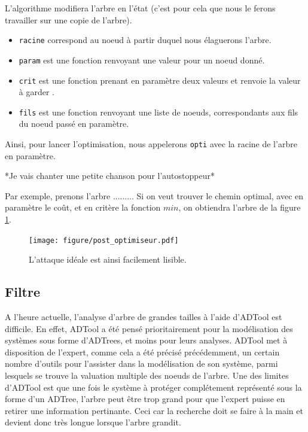 		L'algorithme modifiera l'arbre en l'état (c'est pour cela que nous le ferons travailler sur une copie de l'arbre).
		\begin{itemize}
			\item \verb|racine| correspond au noeud à partir duquel nous élaguerons l'arbre.
			\item \verb|param| est une fonction renvoyant une valeur pour un noeud donné.
			\item \verb|crit| est une fonction prenant en paramètre deux valeurs et renvoie la valeur à \og garder \fg.
			\item \verb|fils| est une fonction renvoyant une liste de noeuds, correspondants aux fils du noeud passé en paramètre.
		\end{itemize}
		Ainsi, pour lancer l'optimisation, nous appelerons \verb|opti| avec la racine de l'arbre en paramètre.

		*Je vais chanter une petite chanson pour l'autostoppeur*

		Par exemple, prenons l'arbre .........
		Si on veut trouver le chemin optimal, avec en paramètre le coût, et en critère la fonction $min$, on obtiendra l'arbre de la figure \ref{fig:arbre_post_opti}.

		\begin{figure}
			\centering
			\texttt{[image: figure/post\_optimiseur.pdf]}
			\caption{L'attaque idéale est ainsi facilement lisible.}
			\label{fig:arbre_post_opti}
		\end{figure}


	\subsection{Filtre}

		A l'heure actuelle, l'analyse d'arbre de grandes tailles à l'aide d'ADTool est difficile. 
		En effet, ADTool a été pensé prioritairement pour la modélisation des systèmes sous forme d'ADTrees, et moins pour leurs analyses. 
		ADTool met à disposition de l'expert, comme cela a été précisé précédemment, un certain nombre d'outils pour l'assister dans la modélisation de son système, parmi lesquels se trouve la valuation multiple des noeuds de l'arbre. 
		Une des limites d'ADTool est que une fois le système à protéger complétement représenté sous la forme d'un ADTree, l'arbre peut être trop grand pour que l'expert puisse en retirer une information pertinante. Ceci car la recherche doit se faire à la main et devient donc très longue lorsque l'arbre grandit. 


